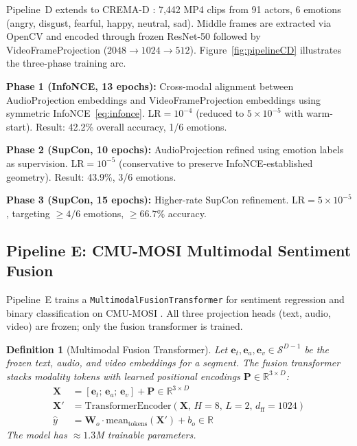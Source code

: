 \documentclass[10pt,conference]{IEEEtran}
\theoremstyle{ieeethm}
\theoremstyle{ieeedef}
\newtheorem{definition}[theorem]{Definition}
\theoremstyle{ieeeremark}
\begin{document}
Pipeline~D extends to CREMA-D \cite{cao2014crema}: 7,442 MP4 clips from 91 actors, 6 emotions (angry, disgust, fearful, happy, neutral, sad). Middle frames are extracted via OpenCV and encoded through frozen ResNet-50 followed by VideoFrameProjection ($2048 \rightarrow 1024 \rightarrow 512$). Figure~\ref{fig:pipelineCD} illustrates the three-phase training arc.

\textbf{Phase 1 (InfoNCE, 13 epochs):} Cross-modal alignment between AudioProjection embeddings and VideoFrameProjection embeddings using symmetric InfoNCE~\eqref{eq:infonce}. LR$=10^{-4}$ (reduced to $5{\times}10^{-5}$ with warm-start). Result: 42.2\% overall accuracy, 1/6 emotions.

\textbf{Phase 2 (SupCon, 10 epochs):} AudioProjection refined using emotion labels as supervision. LR$=10^{-5}$ (conservative to preserve InfoNCE-established geometry). Result: 43.9\%, 3/6 emotions.

\textbf{Phase 3 (SupCon, 15 epochs):} Higher-rate SupCon refinement. LR$=5{\times}10^{-5}$, targeting $\geq 4/6$ emotions, ${\geq}66.7\%$ accuracy.

\subsection{Pipeline E: CMU-MOSI Multimodal Sentiment Fusion}

Pipeline~E trains a \texttt{MultimodalFusionTransformer} for sentiment regression and binary classification on CMU-MOSI \cite{zadeh2016mosi}. All three projection heads (text, audio, video) are frozen; only the fusion transformer is trained.

\begin{definition}[Multimodal Fusion Transformer]
\label{def:fusion_transformer}
Let $\mathbf{e}_t, \mathbf{e}_a, \mathbf{e}_v \in \mathcal{S}^{D-1}$ be the frozen text, audio, and video embeddings for a segment. The fusion transformer stacks modality tokens with learned positional encodings $\mathbf{P} \in \mathbb{R}^{3 \times D}$:
\begin{align}
\mathbf{X} &= [\mathbf{e}_t;\, \mathbf{e}_a;\, \mathbf{e}_v] + \mathbf{P} \in \mathbb{R}^{3 \times D}\\
\mathbf{X}' &= \text{TransformerEncoder}(\mathbf{X},\, H{=}8,\, L{=}2,\, d_\text{ff}{=}1024)\\
\hat{y} &= \mathbf{W}_o \cdot \text{mean}_{\text{tokens}}(\mathbf{X}') + b_o \in \mathbb{R}
\end{align}
The model has $\approx 1.3$M trainable parameters.
\end{definition}
\end{document}
